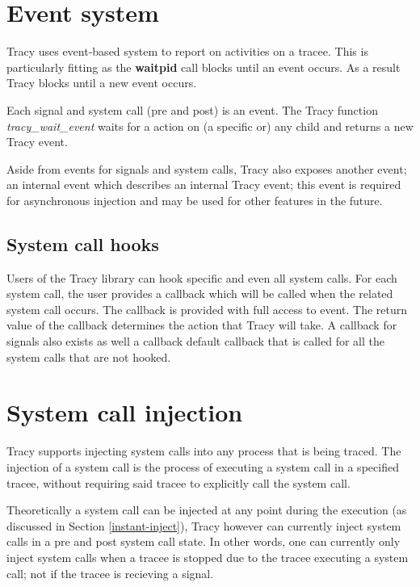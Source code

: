 \documentclass[a4paper, 10pt]{report}
\begin{document}

\section{Event system}
\label{event-system}

Tracy uses event-based system to report on activities on a tracee. This is
particularly fitting as the \textbf{waitpid} call blocks until an event
occurs. As a result Tracy blocks until a new event occurs.

Each signal and system call (pre and post) is an event.
The Tracy function \textit{tracy\_wait\_event} waits for a action on
(a specific or) any child and returns a new Tracy event.

Aside from events for signals and system calls, Tracy also exposes another
event; an internal event which describes an internal Tracy event; this event
is required for asynchronous injection and may be used for other features in
the future.

\subsection{System call hooks}

Users of the Tracy library can hook specific and even all system calls. For
each system call, the user provides a callback which will be called when
the related system call occurs. The callback is provided with full access to
event. The return value of the callback determines the action that Tracy
will take. A callback for signals also exists as well a callback default
callback that is called for all the system calls that are not hooked.

\section{System call injection}
\label{syscall-inject}

Tracy supports injecting system calls into any process that is being traced.
The injection of a system call is the process of executing a system call in
a specified tracee, without requiring said tracee to explicitly call the
system call.

Theoretically a system call can be injected at any point during
the execution (as discussed in Section \ref{instant-inject}),
Tracy however can currently inject system calls in a pre and post
system call state. In other words, one can currently only inject system calls
when a tracee is stopped due to the tracee executing a system call; not if
the tracee is recieving a signal.
\end{document}
